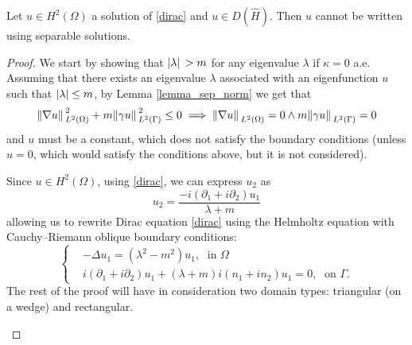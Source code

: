 \begin{proposition}\label{dirac_not_polar}
    Let \(u \in H^2(\Omega)\) a solution of \eqref{dirac} and \(u \in D(\hat{H})\). Then \(u\) cannot be written using separable solutions.
\end{proposition}
\begin{proof}
    We start by showing that \(\abs*{\lambda}>m\) for any eigenvalue \(\lambda\) if \(\kappa = 0\) a.e. Assuming that there exists an eigenvalue \(\lambda\) associated with an eigenfunction \(u\) such that \(\abs{\lambda} \leq m\), by Lemma \ref{lemma_sep_norm} we get that 
    \[
    \norm*{\nabla u }_{L^2(\Omega)}^2 + m \norm*{\gamma u}_{L^2(\Gamma)}^2 \leq 0 \implies \norm*{\nabla u }_{L^2(\Omega)} = 0 \land m \norm*{\gamma u}_{L^2(\Gamma)} = 0
    \]
    and \(u\) must be a constant, which does not satisfy the boundary conditions (unless \(u=0\), which would satisfy the conditions above, but it is not considered).

    Since \(u \in H^2(\Omega)\), using \eqref{dirac}, we can express \(u_2\) as
    \[
    u_2 = \frac{-i (\partial_1 + i\partial_2)u_1}{\lambda + m}    
    \]
    allowing us to rewrite Dirac equation \eqref{dirac} using the Helmholtz equation with Cauchy–Riemann oblique boundary conditions:
    \begin{equation}\label{helm_system}
        \begin{cases}
            &-\Delta u_1 = (\lambda^2 - m^2)u_1, \; \text{ in } \Omega\\
            & i (\partial_1 + i\partial_2)u_1 + (\lambda + m)i(n_1 + i n_2)u_1 = 0, \; \text{ on } \Gamma.
        \end{cases}      
    \end{equation}
    The rest of the proof will have in consideration two domain types: triangular (on a wedge) and rectangular.
    \begin{enumerate}
        

\end{enumerate}
\end{proof}
